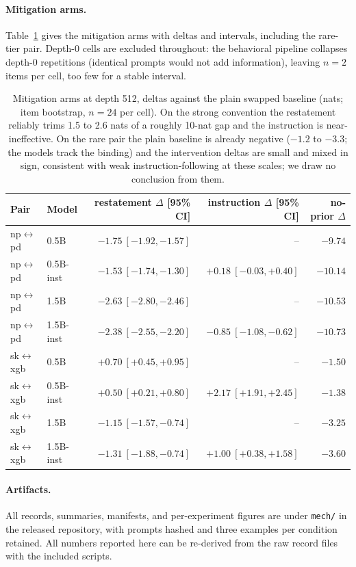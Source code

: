 \documentclass[11pt]{article}
\begin{document}
\paragraph{Mitigation arms.} Table~\ref{tab:armsfull} gives the mitigation arms with deltas and intervals, including the rare-tier pair. Depth-0 cells are excluded throughout: the behavioral pipeline collapses depth-0 repetitions (identical prompts would not add information), leaving $n{=}2$ items per cell, too few for a stable interval.

\begin{table}[t]
\centering
\small
\begin{tabular}{llrrr}
\toprule
\textbf{Pair} & \textbf{Model} & \textbf{restatement $\Delta$ [95\% CI]} & \textbf{instruction $\Delta$ [95\% CI]} & \textbf{no-prior $\Delta$} \\
\midrule
np$\leftrightarrow$pd & 0.5B      & $-1.75\ [-1.92, -1.57]$ & --                      & $-9.74$  \\
np$\leftrightarrow$pd & 0.5B-inst & $-1.53\ [-1.74, -1.30]$ & $+0.18\ [-0.03, +0.40]$ & $-10.14$ \\
np$\leftrightarrow$pd & 1.5B      & $-2.63\ [-2.80, -2.46]$ & --                      & $-10.53$ \\
np$\leftrightarrow$pd & 1.5B-inst & $-2.38\ [-2.55, -2.20]$ & $-0.85\ [-1.08, -0.62]$ & $-10.73$ \\
\midrule
sk$\leftrightarrow$xgb & 0.5B      & $+0.70\ [+0.45, +0.95]$ & --                      & $-1.50$ \\
sk$\leftrightarrow$xgb & 0.5B-inst & $+0.50\ [+0.21, +0.80]$ & $+2.17\ [+1.91, +2.45]$ & $-1.38$ \\
sk$\leftrightarrow$xgb & 1.5B      & $-1.15\ [-1.57, -0.74]$ & --                      & $-3.25$ \\
sk$\leftrightarrow$xgb & 1.5B-inst & $-1.31\ [-1.88, -0.74]$ & $+1.00\ [+0.38, +1.58]$ & $-3.60$ \\
\bottomrule
\end{tabular}
\caption{Mitigation arms at depth 512, deltas against the plain swapped baseline (nats; item bootstrap, $n{=}24$ per cell). On the strong convention the restatement reliably trims 1.5 to 2.6 nats of a roughly 10-nat gap and the instruction is near-ineffective. On the rare pair the plain baseline is already negative ($-1.2$ to $-3.3$; the models track the binding) and the intervention deltas are small and mixed in sign, consistent with weak instruction-following at these scales; we draw no conclusion from them.}
\label{tab:armsfull}
\end{table}

\paragraph{Artifacts.} All records, summaries, manifests, and per-experiment figures are under \texttt{mech/} in the released repository, with prompts hashed and three examples per condition retained. All numbers reported here can be re-derived from the raw record files with the included scripts.
\end{document}
